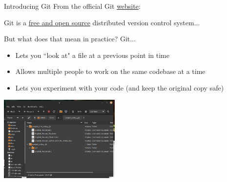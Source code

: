 \documentclass{beamer}
\begin{document}
\begin{frame}{Introducing Git}
	From the official Git \href{https://git-scm.com}{website}: \newline

	\begin{displayquote}
		Git is a \href{https://git-scm.com/about/free-and-open-source}{free and open source} distributed version control system...
	\end{displayquote}

	{
	\small

	But what does that mean in practice? Git...

	\begin{itemize}
		\item Lets you ``look at" a file at a previous point in time
		\item Allows multiple people to work on the same codebase at a time
		\item Lets you experiment with your code (and keep the original copy safe)
	\end{itemize}
	}

	\href{https://raw.githubusercontent.com/ecc-cs-club/slides/main/1-Git-And-GitHub/assets/using-git.png}{
		\includegraphics[width=6cm]{using-git.png}
	}


\end{frame}
\end{document}
